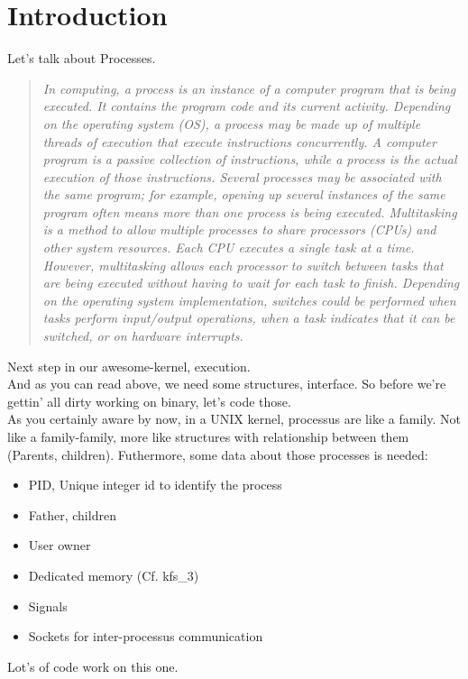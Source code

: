 \documentclass{42-en}
\begin{document}
\chapter{Introduction}
	\normalsize
	Let's talk about Processes.
	\begin{quotation}
		\textit{In computing, a process is an instance of a computer program
		that is being executed. It contains the program code and its current
		activity. Depending on the operating system (OS), a process may be
		made up of multiple threads of execution that execute instructions
		concurrently.
		A computer program is a passive collection of instructions, while a
		process is the actual execution of those instructions. Several
		processes may be associated with the same program; for example, opening
		up several instances of the same program often means more than one
		process is being executed.
		Multitasking is a method to allow multiple processes to share processors
		(CPUs) and other system resources. Each CPU executes a single task at a
		time. However, multitasking allows each processor to switch between
		tasks that are being executed without having to wait for each task to
		finish. Depending on the operating system implementation, switches
		could be performed when tasks perform input/output operations, when a
		task indicates that it can be switched, or on hardware interrupts.}
	\end{quotation}
	Next step in our awesome-kernel, execution.\\
	And as you can read above, we need some structures, interface. So before we're
	gettin' all dirty working on binary, let's code those.\\
	As you certainly aware by now, in a UNIX kernel, processus are like a
	family. Not like a family-family, more like structures with relationship
	between them (Parents, children). Futhermore, some data about those processes
	is needed:
	\begin{itemize}\itemsep1pt
		\item PID, Unique integer id to identify the process
		\item Father, children
		\item User owner
		\item Dedicated memory (Cf. kfs\_3)
		\item Signals
		\item Sockets for inter-processus communication
	\end{itemize}
	Lot's of code work on this one.

\newpage
\end{document}
